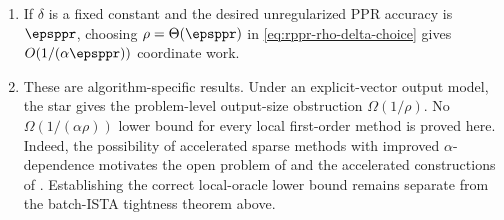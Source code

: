 \begin{enumerate}[leftmargin=*]
    \item If \(\delta\) is a fixed constant and the desired unregularized PPR
    accuracy is \(\epsppr\), choosing
    \(\rho=\Theta(\epsppr)\) in
    \cref{eq:rppr-rho-delta-choice} gives
    \(O(1/(\alpha\epsppr))\) coordinate work.

    \item These are algorithm-specific results.  Under an explicit-vector
    output model, the star gives the problem-level output-size obstruction
    \(\Omega(1/\rho)\).  No \(\Omega(1/(\alpha\rho))\) lower bound for every
    local first-order method is proved here.  Indeed, the possibility of
    accelerated sparse methods with improved \(\alpha\)-dependence motivates
    the open problem of \citet{fountoulakis2022open} and the accelerated
    constructions of \citet{martinezrubio2023accelerated}.  Establishing the
    correct local-oracle lower bound remains separate from the batch-ISTA
    tightness theorem above.
\end{enumerate}
